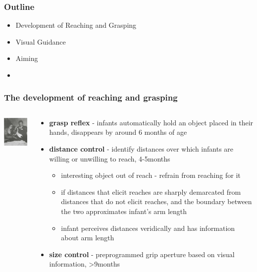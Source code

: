 \documentclass[]{beamer}
\begin{document}
\begin{frame}
 \frametitle{Outline}
\begin{itemize}[<+->]
  \setlength{\itemsep}{5pt}
 \item Development of Reaching and Grasping
 \item Visual Guidance
 \item Aiming
 \item 
\end{itemize}
\end{frame}


\begin{frame}
 \frametitle{The development of reaching and grasping}
\begin{overlayarea}{110mm}{85mm}
\begin{columns}[T]
 \begin{column}{25mm}
\begin{center}
\includegraphics[width=30mm]{figs/l9/grasp_reflex.png}
\end{center}
 \end{column}
 \begin{column}{80mm}
  \begin{itemize}
   \item \textbf{grasp reflex} - infants automatically hold an object placed in their hands, disappears by around 6 months of age 
 \item<2-> \textbf{distance control} - identify distances over which infants are willing or unwilling to reach, 4-5months 
 \begin{itemize}
 \item<3-> interesting object out of reach - refrain from reaching for it
 \item<3->if distances that elicit reaches are sharply demarcated from distances that do not elicit reaches, and the boundary between the two approximates infant's arm length
 \item<3->[$\rightarrow$] infant perceives distances veridically and has information about arm length
 \end{itemize}
\item<4-> \textbf{size control} - preprogrammed grip aperture based on visual information, >9months
  \end{itemize}
 \end{column}
\end{columns}
\end{overlayarea}
\end{frame}
\end{document}
